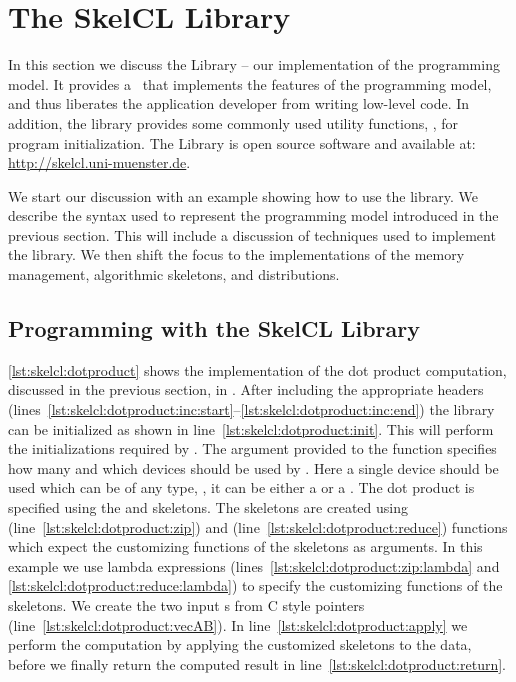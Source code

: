 \section{The SkelCL Library}
\label{section:skelcl-library}
In this section we discuss the \SkelCL Library -- our implementation of the \SkelCL programming model.
It provides a \Cpp~\API that implements the features of the \SkelCL programming model, and thus liberates the application developer from writing low-level code.
In addition, the library provides some commonly used utility functions, \eg, for program initialization.
The \SkelCL Library is open source software and available at: \url{http://skelcl.uni-muenster.de}.

We start our discussion with an example showing how to use the \SkelCL library.
We describe the syntax used to represent the \SkelCL programming model introduced in the previous section.
This will include a discussion of \Cpp techniques used to implement the library.
We then shift the focus to the implementations of the memory management, algorithmic skeletons, and distributions.










\subsection{Programming with the SkelCL Library}

\autoref{lst:skelcl:dotproduct} shows the implementation of the dot product computation, discussed in the previous section, in \SkelCL.
After including the appropriate \SkelCL headers (lines~\autoref{lst:skelcl:dotproduct:inc:start}--\autoref{lst:skelcl:dotproduct:inc:end}) the \SkelCL library can be initialized as shown in line~\autoref{lst:skelcl:dotproduct:init}.
This will perform the initializations required by \OpenCL.
The argument provided to the  function specifies how many and which \OpenCL devices should be used by \SkelCL.
Here a single device should be used which can be of any type, \ie, it can be either a \CPU or a \GPU.
The dot product is specified using the \zip and \reduce skeletons.
The skeletons are created using  (line~\autoref{lst:skelcl:dotproduct:zip}) and  (line~\autoref{lst:skelcl:dotproduct:reduce}) functions which expect the customizing functions of the skeletons as arguments.
In this example we use \Cpp lambda expressions (lines~\autoref{lst:skelcl:dotproduct:zip:lambda} and \autoref{lst:skelcl:dotproduct:reduce:lambda}) to specify the customizing functions of the skeletons.
We create the two input s from C style pointers (line~\autoref{lst:skelcl:dotproduct:vecAB}).
In line~\autoref{lst:skelcl:dotproduct:apply} we perform the computation by applying the customized skeletons to the data, before we finally return the computed result in line~\autoref{lst:skelcl:dotproduct:return}.

